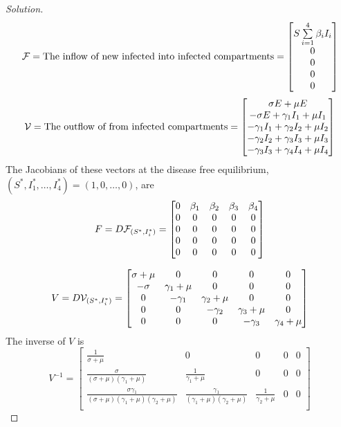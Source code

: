 \documentclass[12pt]{article}\usepackage[]{graphicx}\usepackage[]{color}
\begin{document}
\begin{enumerate}[(a)]
{\begin{proof}[Solution]
{\[
\mathcal{F}= \text{The inflow of new infected into infected compartments} \\
=
\begin{bmatrix}
  S\sum\limits_{i=1}^{4}\beta_i I_i \\
  0 \\
  0 \\
  0 \\
  0 
\end{bmatrix}
\]
\[
\mathcal{V}= \text{The outflow of from infected compartments} \\
=
\begin{bmatrix}
  \sigma E + \mu E \\
  -\sigma E + \gamma_1 I_1 +\mu I_1 \\
  -\gamma_{1} I_{1} +\gamma_{2} I_{2} +\mu I_{2} \\
  -\gamma_{2} I_{2} +\gamma_{3} I_{3} +\mu I_{3} \\
  -\gamma_{3} I_{3} +\gamma_{4} I_{4} +\mu I_{4} 
\end{bmatrix}
\]
The Jacobians of these vectors at the disease free equilibrium, $(S^*,I_1^*,\dots,I_4^*)=(1,0, \dots, 0)$, are
\[
F = D\mathcal{F}_{(S^*,I_i^*)} \\
=
\begin{bmatrix}
  0 & \beta_1 & \beta_2 & \beta_3 & \beta_4 \\
  0 & 0 & 0 & 0 & 0 \\
  0 & 0 & 0 & 0 & 0 \\
  0 & 0 & 0 & 0 & 0 \\
  0 & 0 & 0 & 0 & 0 
\end{bmatrix}
\]

\[
V = D\mathcal{V}_{(S^*,I_i^*)} \\
= \begin{bmatrix}
  \sigma + \mu & 0 & 0 & 0 & 0 \\
  -\sigma & \gamma_1+\mu & 0 & 0 & 0\\
  0 & -\gamma_1 & \gamma_2+\mu & 0 & 0 \\
  0 & 0 & -\gamma_2 & \gamma_3+\mu & 0 \\
  0 & 0 & 0 & -\gamma_3 & \gamma_4+\mu 
\end{bmatrix}
\]
The inverse of $V$ is
\[
V^{-1}= 
\begin{bmatrix}
  \frac{1}{\sigma + \mu} & 0 & 0 & 0 & 0 \\
  \frac{\sigma}{(\sigma + \mu)(\gamma_1+\mu)} & \frac{1}{\gamma_1+\mu} & 0 & 0 & 0\\
  
  \frac{\sigma \gamma_1}{(\sigma + \mu)(\gamma_1+\mu)(\gamma_2+\mu)} & \frac{\gamma_1}{(\gamma_1+\mu)(\gamma_2+\mu)} & \frac{1}{\gamma_2+\mu} & 0 & 0 \\
  

\end{bmatrix}\]}
\end{proof}}
\end{enumerate}
\end{document}
